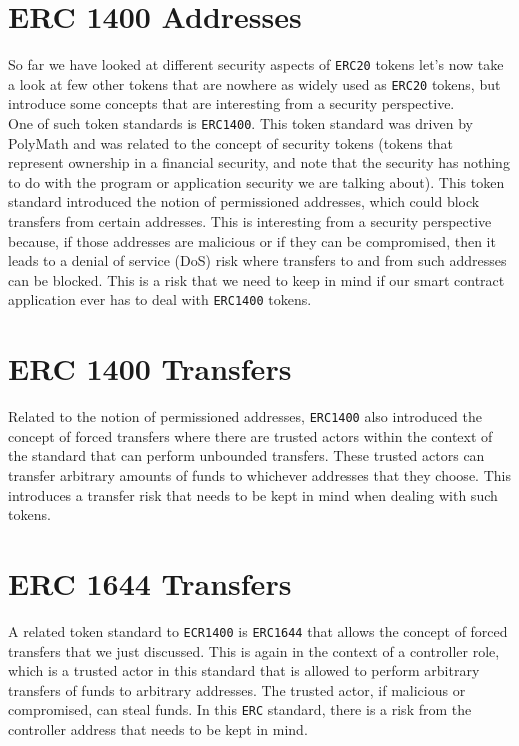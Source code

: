 \section{ERC 1400 Addresses}
So far we have looked at different security aspects of \verb|ERC20| tokens let's now take a look at few other tokens that are nowhere as widely used as \verb|ERC20| tokens, but introduce some concepts that are interesting from a security perspective.\\

One of such token standards is \verb|ERC1400|. This token standard was driven by PolyMath and was related to the concept of security tokens (tokens that represent ownership in a financial security, and note that the security has nothing to do with the program or application security we are talking about). This token standard introduced the notion of permissioned addresses, which could block transfers from certain addresses. This is interesting from a security perspective because, if those addresses are malicious or if they can be compromised, then it leads to a denial of service (DoS) risk where transfers to and from such addresses can be blocked. This is a risk that we need to keep in mind if our smart contract application ever has to deal with \verb|ERC1400| tokens.

\section{ERC 1400 Transfers}
Related to the notion of permissioned addresses, \verb|ERC1400| also introduced the concept of forced transfers where there are trusted actors within the context of the standard that can perform unbounded transfers. These trusted actors can transfer arbitrary amounts of funds to whichever addresses that they choose. This introduces a transfer risk that needs to be kept in mind when dealing with such tokens.

\section{ERC 1644 Transfers}
A related token standard to \verb|ECR1400| is \verb|ERC1644| that allows the concept of forced transfers that we just discussed. This is again in the context of a controller role, which is a trusted actor in this standard that is allowed to perform arbitrary transfers of funds to arbitrary addresses. The trusted actor, if malicious or compromised, can steal funds. In this \verb|ERC| standard, there is a risk from the controller address that needs to be kept in mind.

